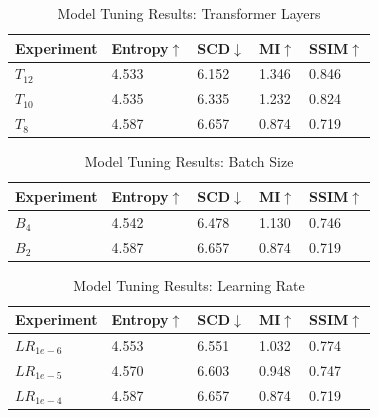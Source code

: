 \begin{table}[h!]
    \centering
    \captionsetup{justification=raggedright,singlelinecheck=false}
    \caption{Model Tuning Results: Transformer Layers}
    \begin{tabular}{|l|l|l|l|l|}
        \hline
        \textbf{Experiment} & \textbf{Entropy\cite{roberts2008assessment}$\uparrow$ } & \textbf{SCD\cite{aslantas2015new}$\downarrow$} & \textbf{MI\cite{qu2002information}$\uparrow$} & \textbf{SSIM\cite{ma2015perceptual}$\uparrow$} \\ \hline
        $T_{12}$ & 4.533 & 6.152 & 1.346 & 0.846 \\ \hline
        $T_{10}$ & 4.535 & 6.335 & 1.232 & 0.824 \\ \hline
        $T_{8}$ & 4.587 & 6.657 & 0.874 & 0.719 \\ \hline
    \end{tabular}
\end{table}

\begin{table}[h!]
    \centering
    \captionsetup{justification=raggedright,singlelinecheck=false}
    \caption{Model Tuning Results: Batch Size}
    \begin{tabular}{|l|l|l|l|l|}
        \hline
        \textbf{Experiment} & \textbf{Entropy\cite{roberts2008assessment}$\uparrow$ } & \textbf{SCD\cite{aslantas2015new}$\downarrow$} & \textbf{MI\cite{qu2002information}$\uparrow$} & \textbf{SSIM\cite{ma2015perceptual}$\uparrow$} \\ \hline 
        $B_{4}$ & 4.542 & 6.478 & 1.130 & 0.746 \\ \hline 
        $B_{2}$ & 4.587 & 6.657 & 0.874 & 0.719 \\ \hline
    \end{tabular}
\end{table}

\begin{table}[h!]
    \centering
    \captionsetup{justification=raggedright,singlelinecheck=false}
    \caption{Model Tuning Results: Learning Rate}
    \begin{tabular}{|l|l|l|l|l|}
        \hline
        \textbf{Experiment} & \textbf{Entropy\cite{roberts2008assessment}$\uparrow$ } & \textbf{SCD\cite{aslantas2015new}$\downarrow$} & \textbf{MI\cite{qu2002information}$\uparrow$} & \textbf{SSIM\cite{ma2015perceptual}$\uparrow$} \\ \hline 
        $LR_{1e-6}$            & 4.553                & 6.551       & 1.032           & 0.774 \\ \hline 
        $LR_{1e-5}$            & 4.570                & 6.603       & 0.948           & 0.747 \\ \hline 
        $LR_{1e-4}$            & 4.587                & 6.657       & 0.874           & 0.719 \\ \hline
    \end{tabular}
\end{table}

